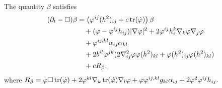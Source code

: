 \documentclass{amsart}
\begin{document}
\begin{lemma}
\label{lem:evbeta}
The quantity $\beta$
satisfies
\[
\begin{split}
(\partial_{t} - \Box)\beta &= \left(\varphi^{ij}(h^2)_{ij} + c\operatorname{tr}(\dot{\varphi}) \right)\beta \\
&\quad + (\varphi - \varphi^{ij}h_{ij}) |\nabla\varphi|^{2} + 2\varphi^{ij}h^{k}_{i}\nabla_k \varphi \nabla_j \varphi \\
&\quad + \varphi^{ij,kl} \alpha_{ij} \alpha_{kl} \\
&\quad + 2b^{il}\varphi^{jk} (2\nabla^2_{ij}\varphi\varphi(h^2)_{kl} + \varphi(h^2)_{ij}\varphi(h^2)_{kl}) \\
&\quad + cR_{\beta},
\end{split}
\]
where
$
R_{\beta} = \varphi \Box \operatorname{tr}(\dot{\varphi}) + 2\varphi^{kl} \nabla_k \operatorname{tr}(\dot{\varphi}) \nabla_l \varphi + \varphi \varphi^{ij,kl}g_{kl} \alpha_{ij} + 2\varphi^{2}\varphi^{ij}h_{ij}.
$
\end{lemma}
\end{document}
